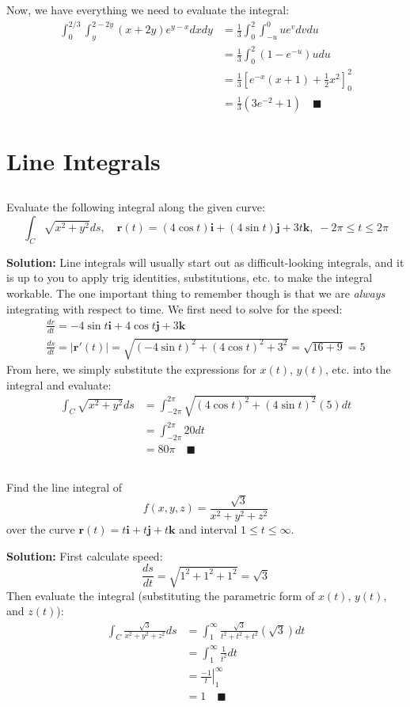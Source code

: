 \documentclass[letterpaper, 11pt]{article}
\begin{document}
Now, we have everything we need to evaluate the integral:
\begin{align*}
\int_0^{2/3} \int_y^{2 - 2y} (x + 2y)e^{y-x}dx dy &= \frac{1}{3} \int_0^2 \int_{-u}^0  u e^v dv du \\
&=  \frac{1}{3} \int_0^2 \left(1 - e^{-u} \right)u du \\
&= \frac{1}{3} \left[ e^{-x}(x+1) + \frac{1}{2}x^2 \right]_0^2 \\
&=  \frac{1}{3} \left( 3e^{-2} + 1\right) \quad\blacksquare
\end{align*}

\section{Line Integrals}
\subsection{} Evaluate the following integral along the given curve:
\[ \int_C \sqrt{x^2 + y^2}ds, \quad \bm{r}(t) = (4 \cos t) \bm{i} + (4 \sin t) \bm{j} + 3t \bm{k},\; - 2\pi\leq t \leq 2 \pi\]
\par \textbf{Solution:} Line integrals will usually start out as difficult-looking integrals, and it is up to you to apply trig identities, substitutions, etc. to make the integral workable. The one important thing to remember though is that we are \textit{always} integrating with respect to time. We first need to solve for the speed:
\begin{gather*}
\frac{dr}{dt} = -4 \sin t \bm{i} + 4 \cos t \bm{j} + 3 \bm{k} \\
\frac{ds}{dt} = |\bm{r}'(t)| = \sqrt{(-4 \sin t)^2 + (4 \cos t)^2 + 3^2} = \sqrt{ 16 + 9} = 5 
\end{gather*}
From here, we simply substitute the expressions for $x(t)$, $y(t)$, etc. into the integral and evaluate:
\begin{align*}
\int_C \sqrt{x^2 + y^2}ds &= \int_{-2\pi}^{2\pi} \sqrt{(4\cos t)^2 + (4 \sin t)^2}(5)dt \\
&=  \int_{-2\pi}^{2\pi} 20 dt \\
&= 80 \pi \quad\blacksquare
\end{align*}

\subsection{} Find the line integral of 
\[ f(x,y, z) = \frac{\sqrt{3}}{x^2 + y^2 + z^2}\] 
over the curve $\bm{r}(t) = t \bm{i} + t\bm{j} + t\bm{k}$ and interval $1 \leq t \leq \infty$.
\par \textbf{Solution:} First calculate speed:
\[ \frac{ds}{dt} = \sqrt{1^2 + 1^2 + 1^2} = \sqrt{3} \]
Then evaluate the integral (substituting the parametric form of $x(t)$, $y(t)$, and $z(t)$):
\begin{align*}
\int_C \frac{\sqrt{3}}{x^2 + y^2 + z^2}ds &= \int_1^\infty  \frac{\sqrt{3}}{t^2 + t^2 + t^2}(\sqrt{3})dt \\
&= \int_1^\infty \frac{1}{t^2} dt\\
&= \left. \frac{-1}{t} \right|_1^\infty \\
&= 1 \quad\blacksquare 
\end{align*}
\end{document}
